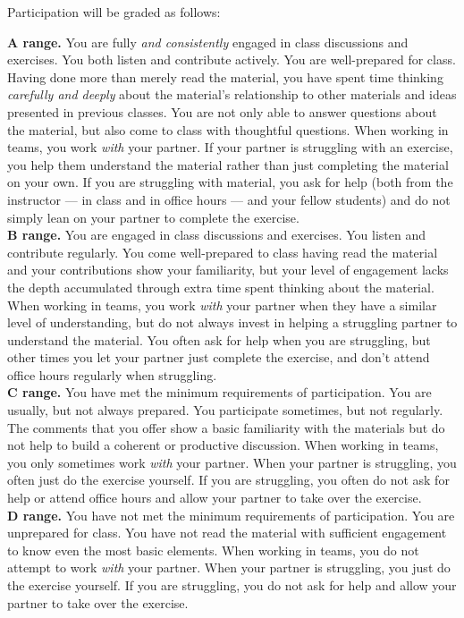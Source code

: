 \documentclass[12pt]{article}
\begin{document}
Participation will be graded as follows:

\textbf{A range.}  You are fully \emph{and consistently} engaged in class discussions and exercises.  You both listen and contribute actively.  You are well-prepared for class.  Having done more than merely read the material, you have spent time thinking \emph{carefully and deeply} about the material's relationship to other materials and ideas presented in previous classes. You are not only able to answer questions about the material, but also come to class with thoughtful questions.  When working in teams, you work \emph{with} your partner. If your partner is struggling with an exercise, you help them understand the material rather than just completing the material on your own. If you are struggling with material, you ask for help (both from the instructor — in class and in office hours — and your fellow students) and do not simply lean on your partner to complete the exercise. \\

\textbf{B range.}  You are engaged in class discussions and exercises.  You listen and contribute regularly.  You come well-prepared to class having read the material and your contributions show your familiarity, but your level of engagement lacks the depth accumulated through extra time spent thinking about the material.  When working in teams, you work \emph{with} your partner when they have a similar level of understanding, but do not always invest in helping a struggling partner to understand the material. You often ask for help when you are struggling, but other times you let your partner just complete the exercise, and don't attend office hours regularly when struggling. \\

\textbf{C range.}  You have met the minimum requirements of participation.  You are usually, but not always prepared.  You participate sometimes, but not regularly.  The comments that you offer show a basic familiarity with the materials but do not help to build a coherent or productive discussion.  When working in teams, you only sometimes work \emph{with} your partner. When your partner is struggling, you often just do the exercise yourself. If you are struggling, you often do not ask for help or attend office hours and allow your partner to take over the exercise. \\

\textbf{D range.}  You have not met the minimum requirements of participation.  You are unprepared for class.  You have not read the material with sufficient engagement to know even the most basic elements.  When working in teams, you do not attempt to work \emph{with} your partner. When your partner is struggling, you just do the exercise yourself. If you are struggling, you do not ask for help and allow your partner to take over the exercise.\\
\end{document}
